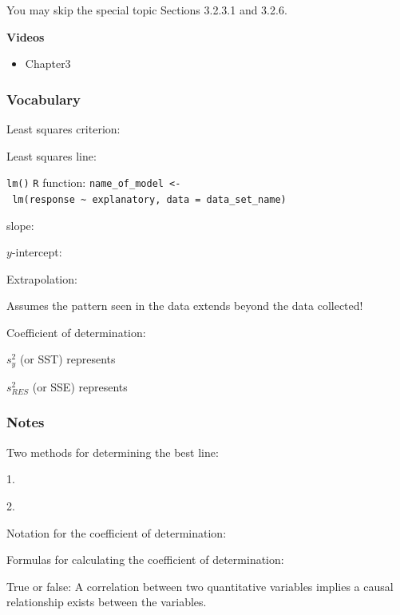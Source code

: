 \documentclass[
]{report}
\providecommand{\tightlist}{%
  \setlength{\itemsep}{0pt}\setlength{\parskip}{0pt}}
\newcommand{\rgs}{\vspace{12pt}} %
\newcommand{\rgi}{\hspace{24pt}}  %
\begin{document}

You may skip the special topic Sections 3.2.3.1 and 3.2.6.

\textbf{Videos}

\begin{itemize}
\tightlist
\item
  Chapter3
\end{itemize}


\hypertarget{vocabulary-7}{%
\subsubsection*{Vocabulary}\label{vocabulary-7}}

Least squares criterion:
\rgs

Least squares line:
\rgs

\texttt{lm()} \texttt{R} function:
\rgi \texttt{name\_of\_model\ \textless{}-\ lm(response\ \textasciitilde{}\ explanatory,\ data\ =\ data\_set\_name)}

\rgs

slope:
\rgs

\(y\)-intercept:\\
\rgs

Extrapolation:

\rgi Assumes the pattern seen in the data extends beyond the data collected!

Coefficient of determination:

\rgi \(s_y^2\) (or SST) represents
\rgs

\rgi \(s_{RES}^2\) (or SSE) represents
\rgs

\hypertarget{notes-9}{%
\subsubsection*{Notes}\label{notes-9}}

Two methods for determining the best line:

\rgi 1.
\rgs

\rgi 2.
\rgs

Notation for the coefficient of determination:
\rgs

Formulas for calculating the coefficient of determination:
\rgs

True or false: A correlation between two quantitative variables implies a causal relationship exists between the variables.
\end{document}
